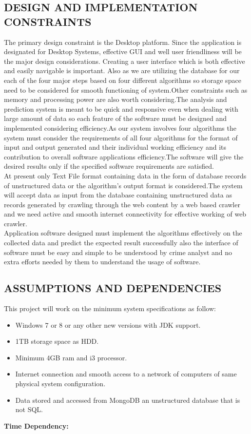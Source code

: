 \documentclass[12pt]{extreport}
\begin{document}
     \subsection{DESIGN AND IMPLEMENTATION CONSTRAINTS}
\hspace*{5em}The primary design constraint is the Desktop platform. Since the application is designated for Desktop Systems, effective GUI and well user friendliness will be the major design considerations. Creating a user interface which is  both effective and easily navigable is important. Also as we are utilizing the database  for our each of the four major steps based on four different algorithms so storage space need to be considered for smooth functioning of system.Other constraints such as memory and processing power are also worth considering.The analysis and prediction system is meant to be quick and responsive even when dealing with large amount of data so each feature of the software must be designed and implemented considering efficiency.As our system involves four algorithms the system must consider the requirements of all four algorithms for the format of input and output generated and their individual working efficiency and its contribution to overall software applications efficiency.The software will give the desired results only if the specified software requirements are satisfied.\\

At present only Text File format containing data in the form of database records of unstructured data or the algorithm's output format is considered.The system will accept data as input from the database containing unstructured data as records generated by crawling through the web content by a web based crawler and we need active and smooth internet connectivity for effective working of web crawler.\\
Application software designed must implement the algorithms effectively on the collected data and predict the expected result successfully also the interface of software must be easy and simple to be understood by crime analyst and no extra efforts needed by them to understand the usage of software.

\newpage
\noindent
     \subsection{ASSUMPTIONS AND DEPENDENCIES}
     This project will work on the minimum system specifications as follow:
\begin{itemize}
\item Windows 7 or 8 or any other new versions with JDK support.
\item 1TB storage space as HDD.
\item Minimum 4GB ram and i3 processor.
\item Internet connection and smooth access to a network of computers of same physical system configuration.
\item Data stored and accessed from MongoDB an unstructured database that is not SQL.
\end{itemize}
\textbf{Time Dependency:}\\
\end{document}
